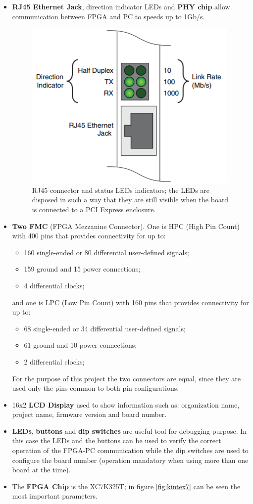 \begin{itemize}
	\item \textbf{RJ45 Ethernet Jack}, direction indicator LEDs and \textbf{PHY chip} allow communication between FPGA and PC to speeds up to 1Gb/s.
	 \begin{figure}[H]
	 	\centering
	 	\includegraphics[width=0.2\linewidth]{IMG/ch3/PHY}
	 	\caption{RJ45 connector and status LEDs indicators; the LEDs are disposed in such a way that they are still visible when the board is connected to a PCI Express enclosure.}
	 	\label{fig:phy}
	 \end{figure}
	\item \textbf{Two FMC} (FPGA Mezzanine Connector). One is HPC (High Pin Count) with 400 pins that provides connectivity for up to:
	\begin{itemize}
		\item 160 single-ended or 80 differential user-defined signals;
		\item 159 ground and 15 power connections;
		\item 4 differential clocks;
	\end{itemize}
	\noindent and one is LPC (Low Pin Count) with 160 pins that provides connectivity for up to:
	\begin{itemize}
		\item 68 single-ended or 34 differential user-defined signals;
		\item 61 ground and 10 power connections;
		\item 2 differential clocks;
	\end{itemize}
	For the purpose of this project the two connectors are equal, since they are used only the pins common to both pin configurations.
	\item 16x2 \textbf{LCD Display} used to show information such as: organization name, project name, firmware version and board number.
	\item \textbf{LEDs}, \textbf{buttons} and \textbf{dip switches} are useful tool for debugging purpose. In this case the LEDs and the buttons can be used to verify the correct operation of the FPGA-PC communication while the dip switches are used to configure the board number (operation mandatory when using more than one board at the time).  
	\item The \textbf{FPGA Chip} is the XC7K325T; in figure \ref{fig:kintex7} can be seen the most important parameters.

\end{itemize}

